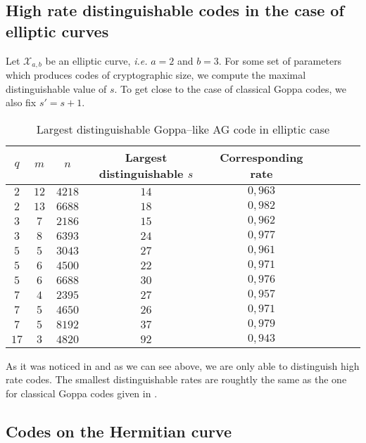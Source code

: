 \documentclass[a4paper]{amsart}
\theoremstyle{definition}
\theoremstyle{remark}
\newcommand{\calX}{\mathcal{X}}
\begin{document}
\subsection{High rate distinguishable codes in the case of elliptic curves}

Let $\calX_{a,b}$ be an elliptic curve, \emph{i.e.} $a=2$ and $b=3$. For some set of parameters which produces codes of cryptographic size, we compute the maximal distinguishable value of $s$. To get close to the case of classical Goppa codes, we also fix $s'=s+1$.
\begin{table}[h]
\begin{center}
\begin{tabular}{|c|c|c||c|c|c|c|c|c|}
    \hline
    $q$ & $m$ & $n$ & Largest distinguishable $s$ & Corresponding rate\\
    \hline \hline
     $2$ & $12$ & $4218$ & $14$ & $0,963$ \\
    \hline 
     $2$ & $13$ & $6688$ & $18$ & $0,982$  \\
    \hline \hline
     $3$ & $7$ & $2186$ & $15$ & $0,962$ \\
    \hline
     $3$ & $8$ & $6393$ & $24$ & $0,977$ \\
    \hline \hline
     $5$ & $5$ & $3043$ & $27$ & $0,961$  \\
    \hline
     $5$ & $6$ & $4500$ & $22$ & $0,971$ \\
    \hline
     $5$  & $6$ & $6688$ & $30$ & $0,976$ \\
    \hline \hline
     $7$ & $4$ & $2395$ & $27$ & $0,957$ \\
    \hline
      $7$ & $5$ & $4650$ & $26$ & $0,971$ \\
    \hline
      $7$ & $5$ & $8192$ & $37$ & $0,979$ \\
    \hline \hline
      $17$ & $3$ & $4820$ & $92$ & $0,943$ \\
    \hline
\end{tabular}
\caption{Largest distinguishable Goppa--like AG code in elliptic case}
\end{center}
\end{table}

As it was noticed in \cite{MT21} and as we can see above, we are only able to distinguish high rate codes. The smallest distinguishable rates are roughtly the same as the one for classical Goppa codes given in \cite{MT21}. 

\subsection{Codes on the Hermitian curve}
\end{document}
